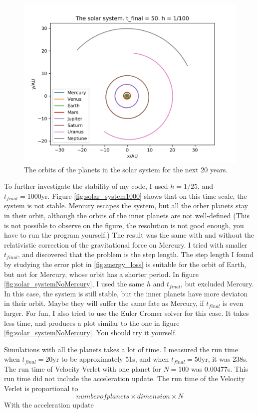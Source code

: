 \documentclass{article}
\begin{document}
\begin{figure}
  \includegraphics[width=\linewidth]{solar_system50.png}
  \caption{The orbits of the planets in the solar system for the next 20 years.}
  \label{fig:solar_system50}
\end{figure}
To further investigate the stability of my code, I used $h=1/25$, and $t_{final}=1000\textrm{yr}$. Figure \ref{fig:solar_system1000} shows that on this time scale, the system is not stable. Mercury escapes the system, but all the orher planets stay in their orbit, although the orbits of the inner planets are not well-defined (This is not possible to observe on the figure, the resolution is not good enough, you have to run the program yourself.) The result was the same with and without the relativistic correction of the gravitational force on Mercury. I tried with smaller $t_{final}$, and discovered that the problem is the step length. The step length I found by studying the error plot in \ref{fig:energy_loss} is suitable for the orbit of Earth, but not for Mercury, whose orbit has a shorter period. In figure \ref{fig:solar_systemNoMercury}, I used the same $h$ and $t_{final}$, but excluded Mercury. In this case, the system is still stable, but the inner planets have more deviaton in their orbit. Maybe they will suffer the same fate as Mercury, if $t_{final}$ is even larger. For fun, I also tried to use the Euler Cromer solver for this case. It takes less time, and produces a plot similar to the one in figure \ref{fig:solar_systemNoMercury}. You should try it yourself. 

Simulations with all the planets takes a lot of time. I measured the run time when $t_{final}=20\textrm{yr}$ to be approximately 51s, and when $t_{final}=50\textrm{yr}$, it was 238s. The run time of Velocity Verlet with one planet for $N=100$ was 0.00477s. This run time did not include the acceleration update. The run time of the Velocity Verlet is proportional to $$number of planets \times dimension  \times N$$
With the acceleration update
\end{document}
